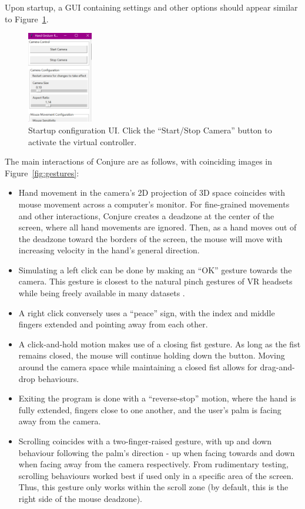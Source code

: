 \documentclass{article}
\begin{document}
Upon startup, a GUI containing settings and other options should appear similar to Figure~\ref{fig:config}.
\begin{figure}
    \centering
    \includegraphics[height=4cm]{config.png}
    \caption{Startup configuration UI. Click the ``Start/Stop Camera'' button to activate the virtual controller.}
    \label{fig:config}
\end{figure}

The main interactions of Conjure are as follows, with coinciding images in Figure~\ref{fig:gestures}:
\begin{itemize}
    \item Hand movement in the camera's 2D projection of 3D space coincides with mouse movement across a computer's monitor. For fine-grained movements and other interactions, Conjure creates a deadzone at the center of the screen, where all hand movements are ignored. Then, as a hand moves out of the deadzone toward the borders of the screen, the mouse will move with increasing velocity in the hand's general direction.
    \item Simulating a left click can be done by making an ``OK'' gesture towards the camera. This gesture is closest to the natural pinch gestures of VR headsets while being freely available in many datasets \cite{Alexander_2024, gesture_recognizer, nuzhdin2024hagridv21mimagesstatic, zimmermann2017learningestimate3dhand}.
    \item A right click conversely uses a ``peace'' sign, with the index and middle fingers extended and pointing away from each other.
    \item A click-and-hold motion makes use of a closing fist gesture. As long as the fist remains closed, the mouse will continue holding down the button. Moving around the camera space while maintaining a closed fist allows for drag-and-drop behaviours.
    \item Exiting the program is done with a ``reverse-stop'' motion, where the hand is fully extended, fingers close to one another, and the user's palm is facing away from the camera.
    \item Scrolling coincides with a two-finger-raised gesture, with up and down behaviour following the palm's direction - up when facing towards and down when facing away from the camera respectively. From rudimentary testing, scrolling behaviours worked best if used only in a specific area of the screen. Thus, this gesture only works within the scroll zone (by default, this is the right side of the mouse deadzone).
\end{itemize}
\end{document}
